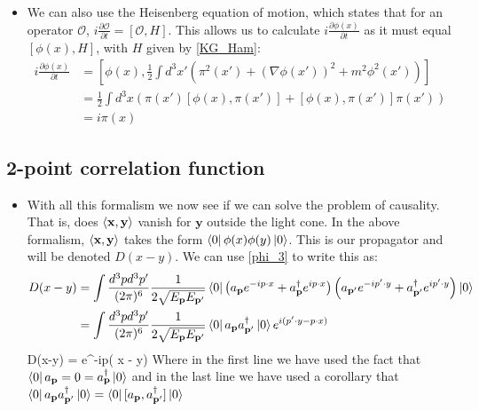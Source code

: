 \documentclass[11pt]{article}
\renewenvironment{flalign}{\vspace{-3mm}\empheq[box=\tcbhighmath]{align}}{\endempheq}
\numberwithin{equation}{section}
\begin{document}
\begin{itemize}
  \item We can also use the Heisenberg equation of motion, which states that for an operator $\mathcal{O}$, $i\frac{\partial \mathcal{O}}{\partial t} = [\mathcal{O},H]$. This allows us to calculate $i\frac{\partial \phi(x)}{\partial t}$ as it must equal $[\phi(x),H]$, with $H$ given by \ref{KG_Ham}:
  \begin{equation*}
  \begin{split}
    i\frac{\partial \phi(x)}{\partial t} & = [\phi(x),\frac{1}{2}\int d^3x'\left(\pi^2(x') +(\nabla\phi(x'))^2+m^2\phi^2(x')\right) ] \\
      & =  \frac{1}{2}\int d^3x \left(\pi(x')[\phi(x), \pi(x')]+[\phi(x), \pi(x')]\pi(x') \right) \\
      & = i \pi(x)
  \end{split}
  \end{equation*}

\end{itemize}
\subsection{2-point correlation function}
\begin{itemize}
  \item  With all this formalism we now see if we can solve the problem of causality. That is, does $\braket{\textbf{x},\textbf{y}}$ vanish for $\textbf{y}$ outside the light cone. In the above formalism, $\braket{\textbf{x},\textbf{y}}$ takes the form $\bra{0}\phi(x)\phi(y)\ket{0}$. This is our propagator and will be denoted $D(x-y)$. We can use \ref{phi_3} to write this as:
  \begin{align*}
   D(x-y) & = \int \frac{d^3pd^3p'}{(2\pi)^6}\frac{1}{2\sqrt{E_{\textbf{p}}E_{\textbf{p}'}}}\bra{0}\left(a_{\textbf{p}}e^{-ip \cdot x}+a^{\dagger}_{\textbf{p}}e^{ip \cdot x}\right)\left(a_{\textbf{p}'}e^{-ip'\cdot y}+a^{\dagger}_{\textbf{p}'}e^{ip' \cdot y}\right)\ket{0}    \\
  & = \int \frac{d^3pd^3p'}{(2\pi)^6}\frac{1}{2\sqrt{E_{\textbf{p}}E_{\textbf{p}'}}}\bra{0}a_{\textbf{p}}a^{\dagger}_{\textbf{p}'}\ket{0}e^{i(p' \cdot y - p \cdot x) } 
  \end{align*}
  \begin{flalign}
  \label{D(x-y)}
  \implies D(x-y) = \int {}e^{-ip\cdot( x - y) }
  \end{flalign}
  Where in the first line we have used the fact that $\bra{0}a_{\textbf{p}} = 0 = a^{\dagger}_{\textbf{p}}\ket{0}$ and in the last line we have used a corollary that $\bra{0}a_{\textbf{p}}a^{\dagger}_{\textbf{p}'}\ket{0}  =\bra{0}[a_{\textbf{p}},a^{\dagger}_{\textbf{p}'}]\ket{0}$
\end{itemize}
\end{document}
